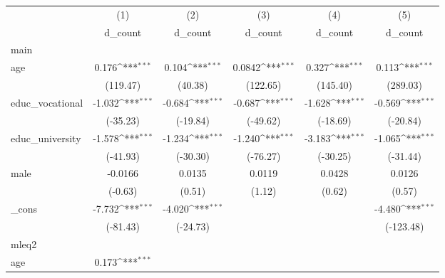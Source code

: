 {
\def\sym#1{\ifmmode^{#1}\else\(^{#1}\)\fi}
\begin{tabular}{l*{5}{c}}
\hline\hline
            &\multicolumn{1}{c}{(1)}&\multicolumn{1}{c}{(2)}&\multicolumn{1}{c}{(3)}&\multicolumn{1}{c}{(4)}&\multicolumn{1}{c}{(5)}\\
            &\multicolumn{1}{c}{d\_count}&\multicolumn{1}{c}{d\_count}&\multicolumn{1}{c}{d\_count}&\multicolumn{1}{c}{d\_count}&\multicolumn{1}{c}{d\_count}\\
\hline
main        &                     &                     &                     &                     &                     \\
age         &       0.176\sym{***}&       0.104\sym{***}&      0.0842\sym{***}&       0.327\sym{***}&       0.113\sym{***}\\
            &    (119.47)         &     (40.38)         &    (122.65)         &    (145.40)         &    (289.03)         \\
[1em]
educ\_vocational&      -1.032\sym{***}&      -0.684\sym{***}&      -0.687\sym{***}&      -1.628\sym{***}&      -0.569\sym{***}\\
            &    (-35.23)         &    (-19.84)         &    (-49.62)         &    (-18.69)         &    (-20.84)         \\
[1em]
educ\_university&      -1.578\sym{***}&      -1.234\sym{***}&      -1.240\sym{***}&      -3.183\sym{***}&      -1.065\sym{***}\\
            &    (-41.93)         &    (-30.30)         &    (-76.27)         &    (-30.25)         &    (-31.44)         \\
[1em]
male        &     -0.0166         &      0.0135         &      0.0119         &      0.0428         &      0.0126         \\
            &     (-0.63)         &      (0.51)         &      (1.12)         &      (0.62)         &      (0.57)         \\
[1em]
\_cons      &      -7.732\sym{***}&      -4.020\sym{***}&                     &                     &      -4.480\sym{***}\\
            &    (-81.43)         &    (-24.73)         &                     &                     &   (-123.48)         \\
\hline
mleq2       &                     &                     &                     &                     &                     \\
age         &       0.173\sym{***}&                     &                     &                     &                     \\

\end{tabular}}
